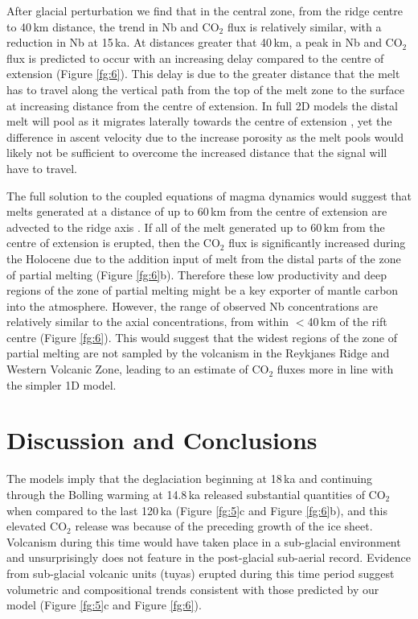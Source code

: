 \documentclass[draft,linenumbers]{agujournal2018}
\begin{document}
After glacial perturbation we find that in the central zone, from the ridge centre to 40\,km distance, the trend in Nb and CO$_{2}$ flux is relatively similar, with a reduction in Nb at 15\,ka. At distances greater that 40\,km, a peak in Nb and CO$_{2}$ flux is predicted to occur with an increasing delay compared to the centre of extension (Figure \ref{fg:6}). This delay is due to the greater distance that the melt has to travel along the vertical path from the top of the melt zone to the surface at increasing distance from the centre of extension. In full 2D models the distal melt will pool as it migrates laterally towards the centre of extension \citep{katz-2008}, yet the difference in ascent velocity due to the increase porosity as the melt pools would likely not be sufficient to overcome the increased distance that the signal will have to travel.

The full solution to the coupled equations of magma dynamics would suggest that melts generated at a distance of up to 60\,km from the centre of extension are advected to the ridge axis \citep{katz-2008}. If all of the melt generated up to 60\,km from the centre of extension is erupted, then the CO$_{2}$ flux is significantly increased during the Holocene due to the addition input of melt from the distal parts of the zone of partial melting (Figure \ref{fg:6}b). Therefore these low productivity and deep regions of the zone of partial melting might be a key exporter of mantle carbon into the atmosphere. However, the range of observed Nb concentrations are relatively similar to the axial concentrations, from within $<$40\,km of the rift centre (Figure \ref{fg:6}). This would suggest that the widest regions of the zone of partial melting are not sampled by the volcanism in the Reykjanes Ridge and Western Volcanic Zone, leading to an estimate of CO$_{2}$ fluxes more in line with the simpler 1D model.

\section{Discussion and Conclusions}

The models imply that the deglaciation beginning at 18\,ka and continuing through the B{\/o}lling warming at 14.8\,ka released substantial quantities of CO$_{2}$ when compared to the last 120\,ka (Figure \ref{fg:5}c and Figure \ref{fg:6}b), and this elevated CO$_{2}$ release was because of the preceding growth of the ice sheet. Volcanism during this time would have taken place in a sub-glacial environment and unsurprisingly does not feature in the post-glacial sub-aerial record. Evidence from sub-glacial volcanic units (tuyas) erupted during this time period \citep{hartley-etal-2016} suggest volumetric and compositional trends consistent with those predicted by our model (Figure \ref{fg:5}c and Figure \ref{fg:6}).
\end{document}
